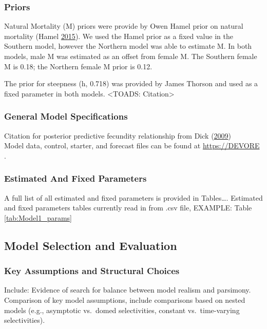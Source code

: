 \documentclass[12pt,]{article}
\begin{document}
\subsubsection{Priors}\label{priors}

Natural Mortality (M) priors were provide by Owen Hamel prior on natural
mortality (Hamel \protect\hyperlink{ref-Hamel2015}{2015}). We used the
Hamel prior as a fixed value in the Southern model, however the Northern
model was able to estimate M. In both models, male M was estimated as an
offset from female M. The Southern female M is 0.18; the Northern female
M prior is 0.12.

The prior for steepness (h, 0.718) was provided by James Thorson and
used as a fixed parameter in both models. \textless{}TOADS:
Citation\textgreater{}

\subsubsection{General Model
Specifications}\label{general-model-specifications}

Citation for posterior predictive fecundity relationship from Dick
(\protect\hyperlink{ref-Dick2009}{2009})\\
Model data, control, starter, and forecast files can be found at
\url{https://DEVORE} .

\subsubsection{Estimated And Fixed
Parameters}\label{estimated-and-fixed-parameters}

A full list of all estimated and fixed parameters is provided in
Tables\ldots{}. Estimated and fixed parameters tables currently read in
from .csv file, EXAMPLE: Table \ref{tab:Model1_params}

\subsection{Model Selection and
Evaluation}\label{model-selection-and-evaluation}

\subsubsection{Key Assumptions and Structural
Choices}\label{key-assumptions-and-structural-choices}

Include: Evidence of search for balance between model realism and
parsimony.\\
Comparison of key model assumptions, include comparisons based on nested
models (e.g., asymptotic vs.~domed selectivities, constant
vs.~time-varying selectivities).
\end{document}
